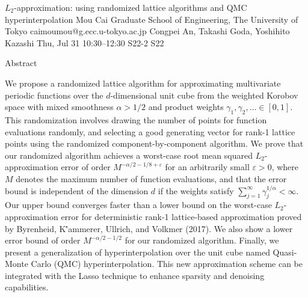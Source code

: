 \begin{talk}
  {$L_2$-approximation: using randomized lattice algorithms and QMC hyperinterpolation}%
  {Mou Cai}%
  {Graduate School of Engineering, The University of Tokyo}%
  {caimoumou@g.ecc.u-tokyo.ac.jp}%
  {Congpei An, Takashi Goda, Yoshihito Kazashi}%
  {}%
  {Thu, Jul 31 10:30–12:30}%
  {S22-2}%
  {S22}%
  
				
Abstract

			
We propose a randomized lattice algorithm for approximating multivariate periodic functions over the $d$-dimensional unit cube from the weighted Korobov space with mixed smoothness $\alpha > 1/2$ and product weights $\gamma_1,\gamma_2,\ldots\in [0,1]$. This randomization involves drawing the number of points for function evaluations randomly, and selecting a good generating vector for rank-1 lattice points using the randomized component-by-component algorithm. We prove that our randomized algorithm achieves a worst-case root mean squared $L_2$-approximation error of order $M^{-\alpha/2 - 1/8 + \varepsilon}$ for an arbitrarily small $\varepsilon > 0$, where $M$ denotes the maximum number of function evaluations, and that the error bound is independent of the dimension $d$ if the weights satisfy $\sum_{j=1}^\infty \gamma_j^{1/\alpha} < \infty$. Our upper bound converges faster than a lower bound on the worst-case $L_2$-approximation error for deterministic rank-1 lattice-based approximation proved by Byrenheid, K\''{a}mmerer, Ullrich, and Volkmer (2017). We also show a lower error bound of order $M^{-\alpha/2-1/2}$ for our randomized algorithm. Finally, we present a generalization of hyperinterpolation over the unit cube named Quasi-Monte Carlo (QMC) hyperinterpolation. This new approximation scheme can be integrated with the Lasso technique to enhance sparsity and denoising capabilities.

\medskip


\end{talk}

